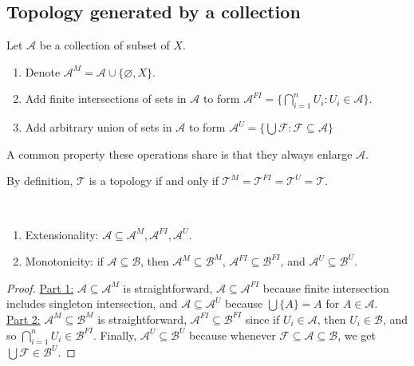 \documentclass{treatise}
\begin{document}
\begin{shaded}
\subsection{Topology generated by a collection}
Let $\mathcal{A}$ be a collection of subset of $X$.
\begin{enumerate}
    \item Denote $\mathcal{A}^{M} = \mathcal{A} \cup \{ \varnothing, X \}$.
    \item Add finite intersections of sets in $\mathcal{A}$ to form $\mathcal{A}^{FI} = \{ \bigcap_{i = 1}^n U_i : U_i \in \mathcal{A} \}$.
    \item Add arbitrary union of sets in $\mathcal{A}$ to form $\mathcal{A}^{U} = \{ \bigcup \mathcal{F} : \mathcal{F} \subseteq \mathcal{A} \}$
\end{enumerate}
A common property these operations share is that they always enlarge $\mathcal{A}$.
\begin{remark}
By definition, $\mathcal{T}$ is a topology if and only if $\mathcal{T}^M = \mathcal{T}^{FI} = \mathcal{T}^U = \mathcal{T}$.
\end{remark}
\begin{remark} \ 
\begin{enumerate}
    \item Extensionality: $\mathcal{A} \subseteq \mathcal{A}^M, \mathcal{A}^{FI}, \mathcal{A}^U$.
    \item Monotonicity: if $\mathcal{A} \subseteq \mathcal{B}$, then $\mathcal{A}^M \subseteq \mathcal{B}^M$, $\mathcal{A}^{FI} \subseteq \mathcal{B}^{FI}$, and $\mathcal{A}^U \subseteq \mathcal{B}^U$.
\end{enumerate}
\end{remark}
\begin{proof}
\underline{Part 1:} $\mathcal{A} \subseteq \mathcal{A}^M$ is straightforward, $\mathcal{A} \subseteq \mathcal{A}^{FI}$ because finite intersection includes singleton intersection, and $\mathcal{A} \subseteq \mathcal{A}^U$ because $\bigcup \{ A \} = A$ for $A \in \mathcal{A}$.
\\
\underline{Part 2:} $\mathcal{A}^M \subseteq \mathcal{B}^M$ is straightforward, $\mathcal{A}^{FI} \subseteq \mathcal{B}^{FI}$ since if $U_i \in \mathcal{A}$, then $U_i \in \mathcal{B}$, and so $\bigcap_{i = 1}^n U_i \in \mathcal{B}^{FI}$. Finally, $\mathcal{A}^U \subseteq \mathcal{B}^U$ because whenever $\mathcal{F} \subseteq \mathcal{A} \subseteq \mathcal{B}$, we get $\bigcup \mathcal{F} \in \mathcal{B}^U$.

\end{proof}
\end{shaded}
\end{document}
